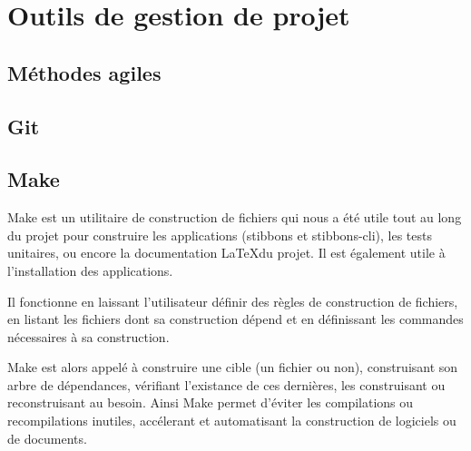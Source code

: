 \section{Outils de gestion de projet}

\subsection{Méthodes agiles}



\subsection{Git}


\subsection{Make}

Make est un utilitaire de construction de fichiers qui nous a été utile tout au long du projet pour construire les applications (stibbons et stibbons-cli), les tests unitaires, ou encore la documentation \LaTeX du projet. Il est également utile à l'installation des applications.

Il fonctionne en laissant l'utilisateur définir des règles de construction de fichiers, en listant les fichiers dont sa construction dépend et en définissant les commandes nécessaires à sa construction.

Make est alors appelé à construire une cible (un fichier ou non), construisant son arbre de dépendances, vérifiant l'existance de ces dernières, les construisant ou reconstruisant au besoin. Ainsi Make permet d'éviter les compilations ou recompilations inutiles, accélerant et automatisant la construction de logiciels ou de documents.
